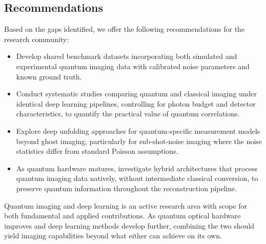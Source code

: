 \subsection*{Recommendations}

Based on the gaps identified, we offer the following recommendations for the research community:
\begin{itemize}
    \item Develop shared benchmark datasets incorporating both simulated and experimental quantum imaging data with calibrated noise parameters and known ground truth.
    \item Conduct systematic studies comparing quantum and classical imaging under identical deep learning pipelines, controlling for photon budget and detector characteristics, to quantify the practical value of quantum correlations.
    \item Explore deep unfolding approaches for quantum-specific measurement models beyond ghost imaging, particularly for sub-shot-noise imaging where the noise statistics differ from standard Poisson assumptions.
    \item As quantum hardware matures, investigate hybrid architectures that process quantum imaging data natively, without intermediate classical conversion, to preserve quantum information throughout the reconstruction pipeline.
\end{itemize}

Quantum imaging and deep learning is an active research area with scope for both fundamental and applied contributions. As quantum optical hardware improves and deep learning methods develop further, combining the two should yield imaging capabilities beyond what either can achieve on its own.
